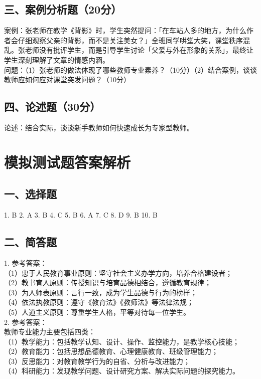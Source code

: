 \documentclass[12pt,a4paper]{article}
\begin{document}
\subsection{三、案例分析题（20分）}
案例：张老师在教学《背影》时，学生突然提问：「在车站人多的地方，为什么作者会仔细观察父亲的背影，而不是关注美女？」全班同学哄堂大笑，课堂秩序混乱。张老师没有批评学生，而是引导学生讨论「父爱与外在形象的关系」，最终让学生深刻理解了文章的情感内涵。\\
问题：（1）张老师的做法体现了哪些教师专业素养？（10分）（2）结合案例，谈谈教师应如何应对课堂突发问题？（10分）\\

\subsection{四、论述题（30分）}
论述：结合实际，谈谈新手教师如何快速成长为专家型教师。\\

\newpage

\section{模拟测试题答案解析}
\subsection{一、选择题}
1. B 2. A 3. B 4. C 5. B 6. A 7. C 8. D 9. B 10. B\\

\subsection{二、简答题}
1. 参考答案：\\
（1）忠于人民教育事业原则：坚守社会主义办学方向，培养合格建设者；\\
（2）教书育人原则：传授知识与培育品德相结合，遵循教育规律；\\
（3）为人师表原则：言行一致，成为学生品德与行为的榜样；\\
（4）依法执教原则：遵守《教育法》《教师法》等法律法规；\\
（5）人道主义原则：尊重学生人格，平等对待每一位学生。\\

2. 参考答案：\\
教师专业能力主要包括四类：\\
（1）教学能力：包括教学认知、设计、操作、监控能力，是教学核心技能；\\
（2）教育能力：包括思想品德教育、心理健康教育、班级管理能力；\\
（3）反思能力：对教育教学行为的自省、分析与改进能力；\\
（4）科研能力：发现教学问题、设计研究方案、解决实际问题的探究能力。\\
\end{document}

